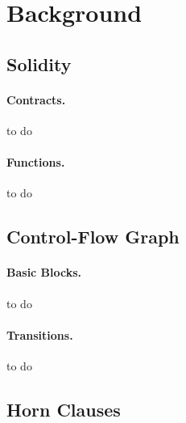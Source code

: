 \section{Background}


\subsection{Solidity}





\paragraph{Contracts.} to do

\paragraph{Functions.} to do


\subsection{Control-Flow Graph}

\paragraph{Basic Blocks.} to do

\paragraph{Transitions.} to do


\subsection{Horn Clauses}

